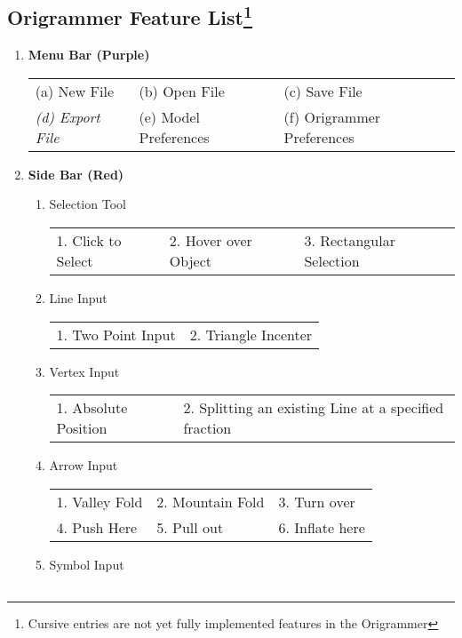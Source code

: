 \subsection[Origrammer Feature List]{Origrammer Feature List\footnote{Cursive entries are not yet fully implemented features in the Origrammer}}
\label{sec:featureList}
\begin{enumerate}
\item \textbf{Menu Bar (Purple)}

\begin{tabular}{l l l}
(a) New File & (b) Open File & (c) Save File \\
\emph{(d) Export File} & (e) Model Preferences & (f) Origrammer Preferences \\
\end{tabular}
\item \textbf{Side Bar (Red)}
    \begin{enumerate}
        \item Selection Tool \\
        \begin{tabular}{l l l}
        1. Click to Select & 2. Hover over Object & 3. Rectangular Selection \\
        \end{tabular}
        \item Line Input \\
        \begin{tabular}{l l}
        1. Two Point Input & 2. Triangle Incenter \\
        \end{tabular}
        \item Vertex Input \\
        \begin{tabular}{l l}
        1. Absolute Position & 2. Splitting an existing Line at a specified fraction \\
        \end{tabular}
        \item Arrow Input \\
        \begin{tabular}{l l l}
        1. Valley Fold & 2. Mountain Fold & 3. Turn over \\
        4. Push Here & 5. Pull out & 6. Inflate here \\
        \end{tabular}
        \item Symbol Input \\
        \begin{tabular}{l l l}

\end{tabular}
\end{enumerate}
\end{enumerate}
